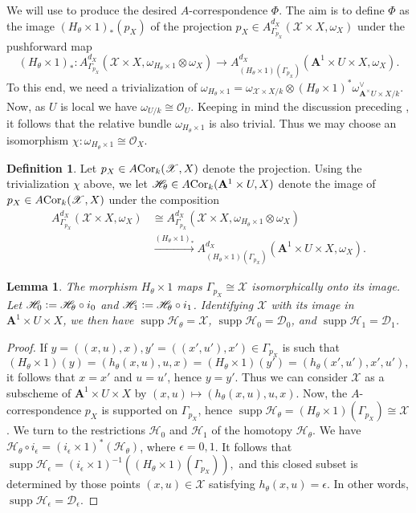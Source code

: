 \documentclass[a4paper, oneside, english,reqno]{amsart}
\theoremstyle{plain}
\newtheorem{lemma}[theorem]{Lemma}
\theoremstyle{definition}
\newtheorem{definition}[theorem]{Definition}
\theoremstyle{remark}
\newcommand{\defeq}{\vcentcolon=}
\newcommand{\ACor}{A\mkern-3mu\Cor}
\newcommand{\A}{\mathbf{A}}
\newcommand{\scrD}{\mathscr{D}}
\newcommand{\scrH}{\mathscr{H}}
\newcommand{\scrX}{\mathscr{X}}
\newcommand{\calO}{\mathcal{O}}
\DeclareMathOperator{\supp}{supp}
\DeclareMathOperator{\Cor}{Cor}
\begin{document}
We will use  to produce the desired $A$-correspondence $\Phi$. The aim is to define $\Phi$ as the image $(H_\theta\times1)_*(p_X)$ of the projection $p_X\in A^{d_X}_{\Gamma_{p_X}}(\scrX\times X,\omega_X)$ under the pushforward map
\[
(H_\theta\times1)_*\colon A^{d_X}_{\Gamma_{p_X}}(\scrX\times X,\omega_{H_\theta\times1}\otimes\omega_X)\to A^{d_X}_{(H_\theta\times1)(\Gamma_{p_X})}(\A^1\times U\times X,\omega_X).
\]
To this end, we need a trivialization of $\omega_{H_\theta\times1}=\omega_{\scrX\times X/k}\otimes(H_\theta\times1)^*\omega_{\A^\times U\times X/k}^\vee$. Now, as $U$ is local we have $\omega_{U/k}\cong\calO_U$. Keeping in mind the discussion preceding , it follows that the relative bundle $\omega_{H_\theta\times1}$ is also trivial.   
Thus we may choose an isomorphism $\chi\colon\omega_{H_\theta\times1}\cong\calO_X$.

\begin{definition}
Let $p_X\in\ACor_k(\scrX,X)$ denote the projection. Using the trivialization $\chi$ above, we let $\scrH_\theta\in\ACor_k(\A^1\times U,X)$ denote the image of $p_X\in\ACor_k(\scrX,X)$ under the composition
\begin{align*}
 A^{d_X}_{\Gamma_{p_X}}(\scrX\times X,\omega_X)&\cong A^{d_X}_{\Gamma_{p_X}}(\scrX\times X,\omega_{H_\theta\times1}\otimes\omega_X)\\
&\xrightarrow{(H_\theta\times1)_*} A_{(H_\theta\times1)(\Gamma_{p_X})}^{d_X}(\A^1\times U\times X,\omega_X).
\end{align*}
\end{definition}

\begin{lemma}\label{lemma:support}
The morphism $H_\theta\times1$ maps $\Gamma_{p_X}\cong\scrX$ isomorphically onto its image. Let $\scrH_0\defeq\scrH_\theta\circ i_0$ and $\scrH_1\defeq\scrH_\theta\circ i_1$. Identifying $\scrX$ with its image in $\A^1\times U\times X$, we then have $\supp\scrH_\theta=\scrX$, $\supp\scrH_0=\scrD_0$, and $\supp\scrH_1=\scrD_1$.
\end{lemma}

\begin{proof}
If $y=((x,u),x),y'=((x',u'),x')\in\Gamma_{p_X}$ is such that
\[
(H_\theta\times1)(y)=(h_\theta(x,u),u,x)=(H_\theta\times1)(y')=(h_\theta(x',u'),x',u'),
\]
it follows that $x=x'$ and $u=u'$, hence $y=y'$. Thus we can consider $\scrX$ as a subscheme of $\A^1\times U\times X$ by $(x,u)\mapsto(h_\theta(x,u),u,x)$. Now, the $A$-correspondence $p_X$ is supported on $\Gamma_{p_X}$, hence $\supp\scrH_\theta=(H_\theta\times1)(\Gamma_{p_X})\cong\scrX$. We turn to the restrictions $\scrH_0$ and $\scrH_1$ of the homotopy $\scrH_\theta$. We have  $\scrH_\theta\circ i_\epsilon=(i_\epsilon\times1)^*(\scrH_\theta)$, where $\epsilon=0,1$. It follows that $\supp\scrH_\epsilon=(i_\epsilon\times1)^{-1}((H_\theta\times1)(\Gamma_{p_X})),$ and this closed subset is determined by those points $(x,u)\in\scrX$ satisfying $h_\theta(x,u)=\epsilon$. In other words, $\supp\scrH_\epsilon=\scrD_\epsilon$.
\end{proof}
\end{document}

